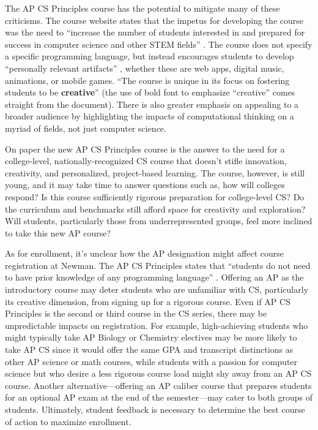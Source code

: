 The AP CS Principles course has the potential to mitigate many of these criticisms. The course website states that the impetus for developing the course was the need to ``increase the number of students interested in and prepared for success in computer science and other STEM fields'' \cite{apcsfaq}. The course does not specify a specific programming language, but instead encourages students to develop ``personally relevant artifacts'' \cite{apframe}, whether these are web apps, digital music, animations, or mobile games. ``The course is unique in its focus on fostering students to be \textbf{creative}'' \cite{apframe} (the use of bold font to emphasize ``creative'' comes straight from the document).  There is also greater emphasis on appealing to a broader audience by highlighting the impacts of computational thinking on a myriad of fields, not just computer science. \par

On paper the new AP CS Principles course is the answer to the need for a college-level, nationally-recognized CS course that doesn't stifle innovation, creativity, and personalized, project-based learning. The course, however, is still young, and it may take time to answer questions such as, how will colleges respond? Is this course sufficiently rigorous preparation for college-level CS? Do the curriculum and benchmarks still afford space for creativity and exploration? Will students, particularly those from underrepresented groups, feel more inclined to take this new AP course? \par
 
As for enrollment, it's unclear how the AP designation might affect course registration at Newman. The AP CS Principles states that ``students do not need to have prior knowledge of any programming language'' \cite{apcsfaq}. Offering an AP as the introductory course may deter students who are unfamiliar with CS, particularly its creative dimension, from signing up for a rigorous course. Even if AP CS Principles is the second or third course in the CS series, there may be unpredictable impacts on registration. For example, high-achieving students who might typically take AP Biology or Chemistry electives may be more likely to take AP CS since it would offer the same GPA and transcript distinctions as other AP science or math courses, while students with a passion for computer science but who desire a less rigorous course load might shy away from an AP CS course. Another alternative---offering an AP caliber course that prepares students for an optional AP exam at the end of the semester---may cater to both groups of students. Ultimately, student feedback is necessary to determine the best course of action to maximize enrollment. \par


